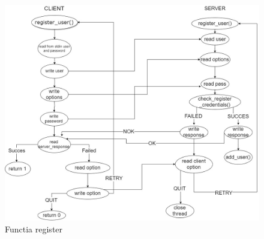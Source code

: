 \documentclass[runningheads]{llncs}
\begin{document}
\begin{figure}[H]
\includegraphics[width=\textwidth]{register.jpg}
\caption{Functia register}
\end{figure}
\end{document}
